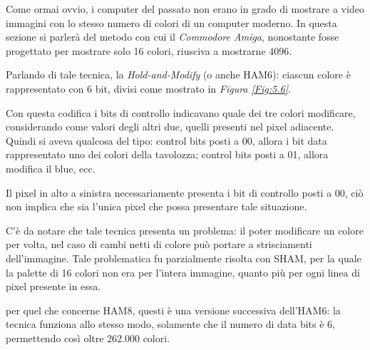 \documentclass{subfiles}
\begin{document}
Come ormai ovvio, i computer del passato non erano in grado di mostrare a video immagini con lo stesso numero di colori di un computer moderno.
In questa sezione si parlerà del metodo con cui il \emph{Commodore Amiga}, nonostante fosse progettato per mostrare solo 16 colori, riusciva a mostrarne 4096.

Parlando di tale tecnica, la \emph{Hold-and-Modify} (o anche HAM6): ciascun colore è rappresentato con 6 bit, divisi come mostrato in \emph{Figura \ref{Fig:5.6}}.

Con questa codifica i bits di controllo indicavano quale dei tre colori modificare, considerando come valori degli altri due, quelli presenti nel pixel adiacente.
Quindi si aveva qualcosa del tipo: control bits posti a 00, allora i bit data rappresentato uno dei colori della tavolozza;
control bits posti a 01, allora modifica il blue, ecc.

\begin{Remark*}
    Il pixel in alto a sinistra necessariamente presenta i bit di controllo posti a 00, ciò non implica che sia l'unica pixel che possa presentare tale situazione.
\end{Remark*}

C'è da notare che tale tecnica presenta un problema: il poter modificare un colore per volta, nel caso di cambi netti di colore può portare a strisciamenti dell'immagine.
Tale problematica fu parzialmente risolta con SHAM, per la quale la palette di 16 colori non era per l'intera immagine, quanto più per ogni linea di pixel presente in essa.

\begin{Note*}\label{Note: }
    per quel che concerne HAM8, questi è una versione successiva dell'HAM6: la tecnica funziona allo stesso modo, solamente che il numero di data bits è 6,
    permettendo così oltre 262.000 colori.
\end{Note*}
\end{document}
